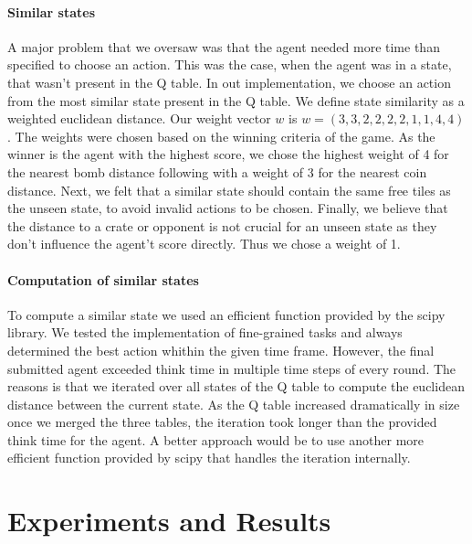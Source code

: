 \documentclass[
	letterpaper, %
	12pt, %
]{CSUniSchoolLabReport}
\begin{document}
\paragraph*{Similar states}
A major problem that we oversaw was that the agent needed more time than specified to choose an action.
This was the case, when the agent was in a state, that wasn't present in the Q table. In out implementation, we
choose an action from the most similar state present in the Q table. We define state similarity as a weighted euclidean
distance. Our weight vector $w$ is $ w= (3, 3, 2, 2, 2, 2, 1, 1, 4, 4)$. The weights were
chosen based on the winning criteria of the game. As the winner is the agent with the highest score,
we chose the highest weight of 4 for the nearest bomb distance following with a weight of 3 for the nearest coin distance.
Next, we felt that a similar state should contain the same free tiles as the unseen state, to avoid invalid actions to be chosen.
Finally, we believe that the distance to a crate or opponent is not crucial for an unseen state as they don't influence the agent't score directly.
Thus we chose a weight of 1.

\paragraph*{Computation of similar states}
To compute a similar state we used an efficient function provided by the scipy library. We
tested the implementation of fine-grained tasks and always determined the best action
whithin the given time frame. However, the final submitted agent exceeded think time in multiple time steps of every round.
The reasons is that we iterated over all states of the Q table to compute the euclidean distance between
the current state. As the Q table increased dramatically in size once we merged the three tables, the iteration took longer than the provided
think time for the agent. A better approach would be to use another more efficient function provided by scipy
that handles the iteration internally.





\section{Experiments and Results}
\end{document}
